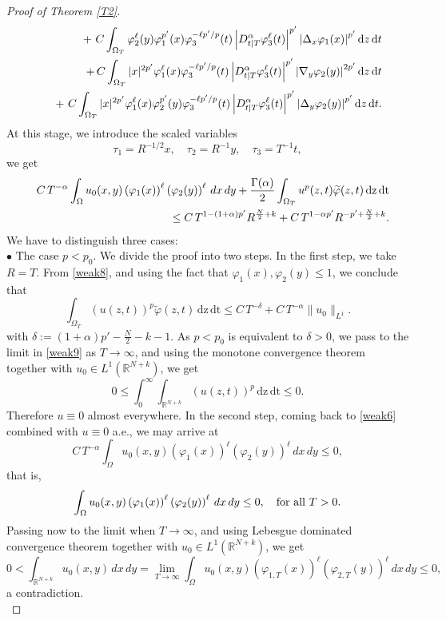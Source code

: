 \documentclass[10pt,a4paper]{amsart}
\def\R{{\mathbb {R}}}
\begin{document}
\begin{proof}[Proof of Theorem \ref{T2}]
\begin{eqnarray}
		&{}&\quad+\,\,C\int_{\Omega_T}\varphi_2^\ell(y)\varphi_1^{p'}(x)\varphi_3^{-\ell p^\prime/p}(t)\left|D^{\alpha}_{t|T} \varphi^\ell_3(t)\right|^{p'}\left|\Delta_x \varphi_1(x)\right|^{p'}\mathrm{d}z\,\mathrm{d}t\notag\\
		&&\quad+\,C\int_{\Omega_T}|x|^{2p'}\varphi_1^\ell(x)\varphi_3^{-\ell p^\prime/p}(t)\left|D^{\alpha}_{t|T} \varphi^\ell_3(t)\right|^{p'}\left|\nabla_y \varphi_2(y)\right|^{2p'}\mathrm{d}z\,\mathrm{d}t\notag\\
		&{}&\quad+\,\,C\int_{\Omega_T}|x|^{2p'}\varphi_1^\ell(x)\varphi_2^{p'}(y)\varphi_3^{-\ell p^\prime/p}(t)\left|D^{\alpha}_{t|T} \varphi^\ell_3(t)\right|^{p'}\left|\Delta_y \varphi_2(y)\right|^{p'}\mathrm{d}z\,\mathrm{d}t.
	\end{eqnarray}
	At this stage, we introduce the scaled variables 
	\begin{equation}\label{changevar}
		\tau_1=R^{-1/2}x,\quad \tau_2=R^{-1}y,\quad \tau_3=T^{-1}t,	
	\end{equation} 
	we get
	\begin{eqnarray}\label{weak8}
		&&C\,T^{-\alpha}\int_{\Omega}u_0(x,y)\left(\varphi_1(x)\right)^\ell \left(\varphi_2(y)\right)^\ell\,dx\,dy+\frac{\Gamma(\alpha)}{2}\int_{\Omega_T}u^{p}(z,t)\widetilde{\varphi}(z,t)\,\mathrm{dz}\,\mathrm{dt}\notag\\
		&&\leq C\,T^{1-(1+\alpha)p'}R^{\frac{N}{2}+k}+C\,T^{1-\alpha p'}R^{-p'+\frac{N}{2}+k}.
	\end{eqnarray}
	We have to distinguish three cases:\\
	
	\noindent $\bullet$ The case $p<p_0$. We divide the proof into two steps. In the first step, we take $R=T$. From \eqref{weak8}, and using the fact that $\varphi_1(x),\varphi_2(y)\leq 1$, we conclude that
	\begin{equation}\label{weak9}
		\int_{\Omega_T}(u(z,t))^{p}\widetilde{\varphi}(z,t)\,\mathrm{dz}\,\mathrm{dt}\leq C\,T^{-\delta}+C\,T^{-\alpha}\|u_0\|_{L^1}.
	\end{equation}
	with $\delta:=(1+\alpha)p'-\frac{N}{2}-k-1$. As $p<p_0$ is equivalent to $\delta>0$, we pass to the limit in \eqref{weak9} as $T\rightarrow\infty$, and using the monotone convergence theorem together with $u_0\in L^1(\mathbb{R}^{N+k})$, we get
	$$0\leq \int_0^\infty\int_{\R^{N+k}}(u(z,t))^{p}\,\mathrm{dz}\,\mathrm{dt}\leq 0.$$
	Therefore $u\equiv 0$ almost everywhere. In the second step, coming back to \eqref{weak6} combined with $u\equiv0$ a.e., we may arrive at
	$$C\,T^{-\alpha}\int_{\Omega}u_0(x,y)\left(\varphi_1(x)\right)^\ell \left(\varphi_2(y)\right)^\ell \,dx\,dy\leq 0,$$
	that is,
	$$\int_{\Omega}u_0(x,y)\left(\varphi_1(x)\right)^\ell \left(\varphi_2(y)\right)^\ell \,dx\,dy\leq 0,\quad\hbox{for all}\,\,T>0.$$
	Passing now to the limit when $T\rightarrow\infty$, and using Lebesgue dominated convergence theorem together with $u_0\in L^1(\mathbb{R}^{N+k})$, we get
	\[
	0<\int_{\R^{N+k}}u_0(x,y)\,dx\,dy=\lim_{T\rightarrow\infty}\int_{\Omega}u_0(x,y)\left(\varphi_{1,T}(x)\right)^\ell \left(\varphi_{2,T}(y)\right)^\ell\,dx\,dy\leq 0 ,
	\]
	a contradiction.\\
	

\end{proof}
\end{document}
